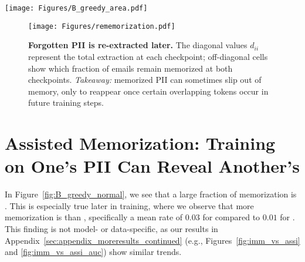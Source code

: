 \begin{figure*}[t]
  \texttt{[image: Figures/B\_greedy\_area.pdf]}  
  \caption{\textbf{Tracking memorization throughout training with our taxonomy.} The stacked bars show how many newly memorized emails are \novel, \retained, and \assisted, while red denotes forgotten emails since the last checkpoint. We see large amounts of \assisted memorization occurring later in training, underscoring that PII is not always memorized immediately. \textit{Takeaway:} memorization is more dynamic and stochastic than often assumed, with ongoing cycles of \textcolor{red}{forgotten} and newly \assisted emails.}
  \label{fig:B_greedy_normal}
\end{figure*}

\begin{figure}[t]
  \centering
  \texttt{[image: Figures/rememorization.pdf]}
  \caption{\textbf{Forgotten PII is re-extracted later.} The diagonal values \(d_{ii}\) represent the total extraction at each checkpoint; off-diagonal cells show which fraction of emails remain memorized at both checkpoints. 
  \textit{Takeaway:} memorized PII can sometimes slip out of memory, only to reappear once certain overlapping tokens occur in future training steps.}
  \label{fig:rememorization}
\end{figure}




\section{Assisted Memorization: Training on One's PII Can Reveal Another's}
\label{section:assisted_memorization}

In Figure~\ref{fig:B_greedy_normal}, we see that a large fraction of memorization is \assisted. This is especially true later in training, where we observe that more memorization is \assisted than \novel, specifically a mean rate of $0.03$ for \assisted compared to $0.01$ for \novel. This finding is not model- or data-specific, as our results in Appendix~\ref{sec:appendix_moreresults_continued} (e.g., Figures~\ref{fig:imm_vs_assi} and \ref{fig:imm_vs_assi_auc}) show similar trends.


